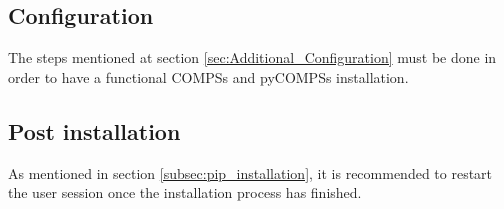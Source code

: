 \subsection{Configuration}
\label{subsec:pip_configuration}
The steps mentioned at section \ref{sec:Additional_Configuration} must be done in order to have a functional COMPSs and pyCOMPSs installation.
\subsection{Post installation}
As mentioned in section \ref{subsec:pip_installation}, it is recommended to restart the user session once the installation process has finished.
